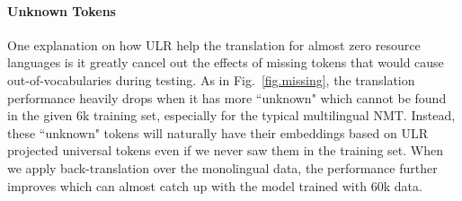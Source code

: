 \paragraph{Unknown Tokens}
One explanation on how ULR help the translation for almost zero resource languages is it greatly cancel out the effects of missing tokens that would cause out-of-vocabularies during testing. As in Fig.~\ref{fig.missing}, the translation performance heavily drops when it has more ``unknown" which cannot be found in the given 6k training set, especially for the typical multilingual NMT.  Instead, these ``unknown" tokens will naturally have their embeddings based on ULR  projected universal tokens even if we never saw them in the training set. When we apply back-translation over the monolingual data, the performance  further improves which can almost catch up with the model trained with 60k data. %






